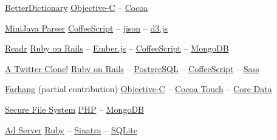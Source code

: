 \documentclass{tccv}
\begin{document}
{{\begin{oneline_projects}

\item{\href{http://pooriaazimi.github.io/BetterDictionary/}{BetterDictionary}}
	 {%
	 	\href{https://en.wikipedia.org/wiki/Objective-C}{Objective-C} -- %
		\href{https://en.wikipedia.org/wiki/Cocoa_(API)}{Cocoa}%
	 }	

\item{\href{https://github.com/pooriaazimi/Mini-Java}{MiniJava Parser}}
	 {%
		 \href{http://coffeescript.org}{CoffeeScript} -- %
		 \href{http://zaach.github.io/jison/}{jison} -- %
		 \href{http://d3js.org}{d3.js}%
	 }	

\item{\href{https://github.com/pooriaazimi/Readr}{Readr}}
	 {%
		 \href{http://rubyonrails.org}{Ruby on Rails} -- %
		 \href{http://emberjs.com}{Ember.js} -- %
		 \href{http://coffeescript.org}{CoffeeScript} -- %
		 \href{http://www.mongodb.org}{MongoDB}%
	 }

\item{\href{https://github.com/pooriaazimi/twitter}{A Twitter Clone!}}
	 {%
		 \href{http://rubyonrails.org}{Ruby on Rails} -- %
		 \href{http://www.postgresql.org}{PostgreSQL} -- %
		 \href{http://coffeescript.org}{CoffeeScript} -- %
		 \href{http://sass-lang.com}{Sass}%
	 }


\item{\href{http://www.turnedondigital.com/?portfolio=farhang-iphone-app}{Farhang} \large{\rm(partial contribution)}}
	 {%
	 	\href{https://en.wikipedia.org/wiki/Objective-C}{Objective-C} -- %
		\href{https://en.wikipedia.org/wiki/Cocoa_Touch}{Cocoa Touch} -- %
		\href{https://en.wikipedia.org/wiki/Core_Data}{Core Data}%
	 }

\item{\href{https://github.com/pooriaazimi/secure_file_system}{Secure File System}}
	 {%
		 \href{http://php.net}{PHP} -- %
		 \href{http://www.mongodb.org}{MongoDB}%
	 }

\item{\href{https://github.com/pooriaazimi/adserver}{Ad Server}}
	 {%
	 	\href{https://www.ruby-lang.org/en/}{Ruby} -- %
		\href{http://www.sinatrarb.com}{Sinatra} -- %
		\href{http://www.sqlite.org}{SQLite}%
	 }


\end{oneline_projects}





\vspace{-20pt}




}}
\end{document}

